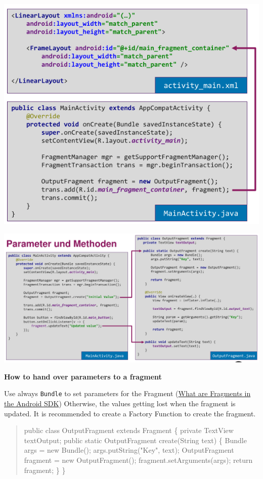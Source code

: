 \documentclass[11pt,twoside,landscape]{article}
\begin{document}
\begin{multicols}{3}
\begin{center}
\includegraphics[width=.9\linewidth]{img/fragment_dynamic_include.png}
\end{center}

\begin{center}
\includegraphics[width=.9\linewidth]{img/fragment_parameter_method.png}
\end{center}


\textbf{How to hand over parameters to a fragment}

Use always \texttt{Bundle} to set parameters for the Fragment (\href{../../../roam/20211023174645-what_are_fragments_in_the_android_sdk.org}{What are Fragments in the Android SDK})
Otherwise, the values getting lost when the fragment is updated.
It is recommended to create a Factory Function to create the fragment.
\begin{quote}
public class OutputFragment extends Fragment \{
    private TextView textOutput;
    public static OutputFragment create(String text) \{
	Bundle args = new Bundle();
	args.putString("Key", text);
	OutputFragment fragment = new OutputFragment();
	fragment.setArguments(args);
	return fragment;
    \}
\}
\end{quote}



\end{multicols}
\end{document}
